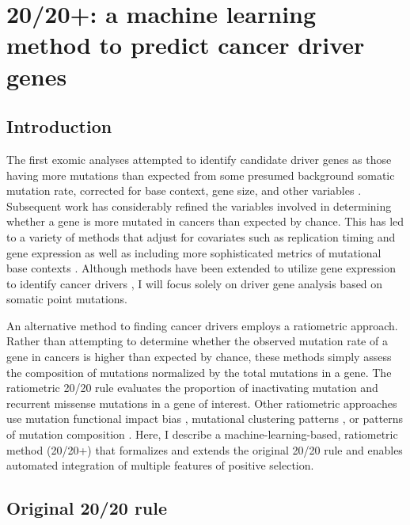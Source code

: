 
\chapter{20/20+: a machine learning method to predict cancer driver genes}
\label{chap:ch3}

\section{Introduction}

The first exomic analyses attempted to identify candidate driver genes as those having more mutations than expected from some presumed background somatic mutation rate, corrected for base context, gene size, and other variables \cite{RN78, RN4}. Subsequent work has considerably refined the variables involved in determining whether a gene is more mutated in cancers than expected by chance. This has led to a variety of  methods that adjust for covariates such as replication timing and gene expression as well as including more sophisticated metrics of mutational base contexts \cite{RN13, RN43}. Although methods have been extended to utilize gene expression to identify cancer drivers \cite{RN80, RN84, RN81, RN83, RN79, RN82}, I will focus solely on driver gene analysis based on somatic point mutations.

An alternative method to finding cancer drivers employs a ratiometric approach. Rather than attempting to determine whether the observed mutation rate of a gene in cancers is higher than expected by chance, these methods simply assess the composition of mutations normalized by the total mutations in a gene. The ratiometric 20/20 rule \cite{RN25} evaluates the proportion of inactivating mutation and recurrent missense mutations in a gene of interest. Other ratiometric approaches use mutation functional impact bias \cite{RN86, RN53}, mutational clustering patterns \cite{RN87, RN54, RN71}, or patterns of mutation composition \cite{RN71}. Here, I describe a machine-learning-based, ratiometric method (20/20+) that formalizes and extends the original 20/20 rule and enables automated integration of multiple features of positive selection.

\section{Original 20/20 rule}

